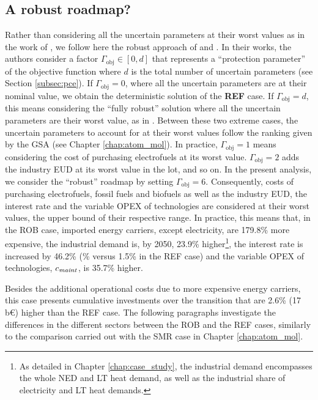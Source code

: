 \subsection{A robust roadmap?}
\label{subsec:RobPol:Rob_roadmap}
Rather than considering all the uncertain parameters at their worst values as in the work of \citet{soyster1973convex}, we follow here the robust approach of \citet{bertsimas2004price} and \citet{Moret2017PhDThesis}. In their works, the authors consider a factor $\Gamma_{\text{obj}}\in [0,d]$ that represents a ``protection parameter'' of the objective function where $d$ is the total number of uncertain parameters (see Section \ref{subsec:pce}). If $\Gamma_{\text{obj}}= 0$, where all the uncertain parameters are at their nominal value, we obtain the deterministic solution of the \textbf{REF} case. If $\Gamma_{\text{obj}}= d$, this means considering the ``fully robust'' solution where all the uncertain parameters are their worst value, as in \citet{soyster1973convex}.  Between these two extreme cases, the uncertain parameters to account for at their worst values follow the ranking given by the \gls{GSA} (see Chapter \ref{chap:atom_mol}). In practice, $\Gamma_{\text{obj}}= 1$ means considering the cost of purchasing electrofuels at its worst value. $\Gamma_{\text{obj}}= 2$ adds the industry \gls{EUD} at its worst value in the lot, and so on. In the present analysis, we consider the ``robust'' roadmap by setting $\Gamma_{\text{obj}}= 6$. Consequently, costs of purchasing electrofuels, fossil fuels and biofuels as well as the industry \gls{EUD}, the interest rate and the variable OPEX of technologies are considered at their worst values, \ie the upper bound of their respective range. In practice, this means that, in the ROB case, imported energy carriers, except electricity, are 179.8\% more expensive, the industrial demand is, by 2050, 23.9\% higher\footnote{As detailed in Chapter \ref{chap:case_study}, the industrial demand encompasses the whole \gls{NED} and \gls{LT} heat demand, as well as the industrial share of electricity and \gls{LT} heat demands.}, the interest rate is increased by 46.2\% (\% versus 1.5\% in the REF case) and the variable OPEX of technologies, $c_{\text{\emph{maint}}}$, is 35.7\% higher. 

Besides the additional operational costs due to more expensive energy carriers, this case presents cumulative investments over the transition that are 2.6\% (17\,b€) higher than the REF case. The following paragraphs investigate the differences in the different sectors between the ROB and the REF cases, similarly to the comparison carried out with the SMR case in Chapter \ref{chap:atom_mol}.\\


